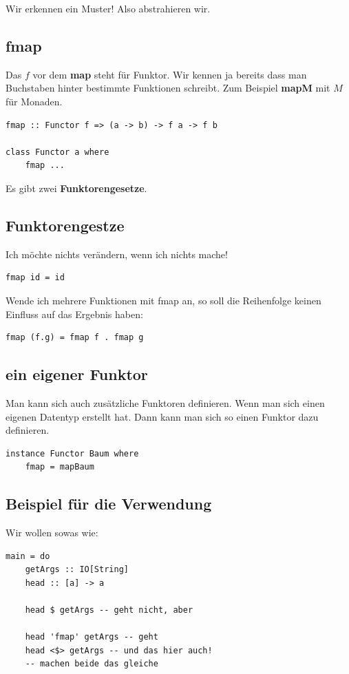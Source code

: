 \documentclass[ngerman,a4paper]{report}
\begin{document}
Wir erkennen ein Muster! Also abstrahieren wir.\\

\subsection{fmap}
Das $f$ vor dem \textbf{map} steht für Funktor. Wir kennen ja bereits dass man Buchstaben hinter bestimmte Funktionen schreibt. Zum Beispiel \textbf{mapM} mit $M$ für Monaden.

\begin{lstlisting}
fmap :: Functor f => (a -> b) -> f a -> f b

class Functor a where
	fmap ...
\end{lstlisting}

Es gibt zwei \textbf{Funktorengesetze}.
\subsection{Funktorengestze}
\begin{compactenum}
	\item Ich möchte nichts verändern, wenn ich nichts mache!
	\begin{lstlisting}
fmap id = id
	\end{lstlisting}
	\item Wende ich mehrere Funktionen mit fmap an, so soll die Reihenfolge keinen Einfluss auf das Ergebnis haben:
	\begin{lstlisting}
fmap (f.g) = fmap f . fmap g
	\end{lstlisting}
\end{compactenum}

\subsection{ein eigener Funktor}
Man kann sich auch zusätzliche Funktoren definieren. Wenn man sich einen eigenen Datentyp erstellt hat. Dann kann man sich so einen Funktor dazu definieren.
\begin{lstlisting}
instance Functor Baum where
	fmap = mapBaum
\end{lstlisting}

\subsection{Beispiel für die Verwendung}
Wir wollen sowas wie:
\begin{lstlisting}
main = do
	getArgs :: IO[String]
	head :: [a] -> a
	
	head $ getArgs -- geht nicht, aber

	head 'fmap' getArgs -- geht
	head <$> getArgs -- und das hier auch!
	-- machen beide das gleiche
\end{lstlisting}
\end{document}
